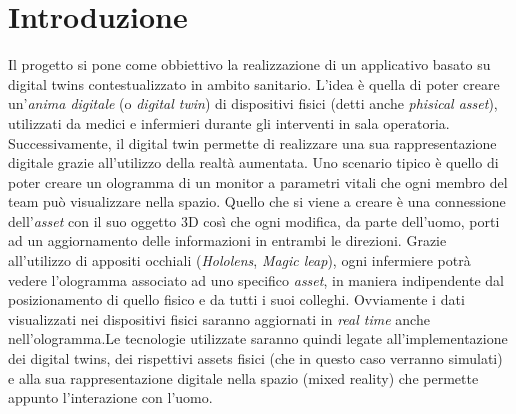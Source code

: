 \chapter{Introduzione}
Il progetto si pone come obbiettivo la realizzazione di un applicativo basato su digital twins contestualizzato in ambito sanitario. L'idea è quella di poter creare un'\textit{anima digitale} (o \textit{digital twin}) di dispositivi fisici (detti anche \textit{phisical asset}), utilizzati da medici e infermieri durante gli interventi in sala operatoria. Successivamente, il digital twin permette di realizzare una sua rappresentazione digitale grazie all'utilizzo della realtà aumentata. Uno scenario tipico è quello di poter creare un ologramma di un monitor a parametri vitali che ogni membro del team può visualizzare nella spazio. Quello che si viene a creare è una connessione dell'\textit{asset} con il suo oggetto 3D così che ogni modifica, da parte dell'uomo, porti ad un aggiornamento delle informazioni in entrambi le direzioni. Grazie all'utilizzo di appositi occhiali (\textit{Hololens}, \textit{Magic leap}), ogni infermiere potrà vedere l'ologramma associato ad uno specifico \textit{asset}, in maniera indipendente dal posizionamento di quello fisico e da tutti i suoi colleghi. Ovviamente i dati visualizzati nei dispositivi fisici saranno aggiornati in \textit{real time} anche nell'ologramma.\newline \newline Le tecnologie utilizzate saranno quindi legate all'implementazione dei digital twins, dei rispettivi assets fisici (che in questo caso verranno simulati) e alla sua rappresentazione digitale nella spazio (mixed reality) che permette appunto l'interazione con l'uomo.